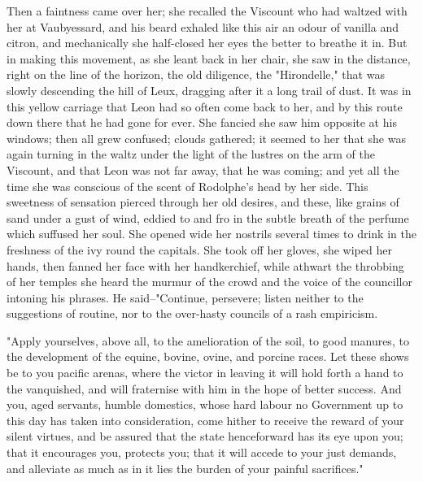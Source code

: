 \documentclass{tufte-book}
\begin{document}
Then a faintness came over her; she recalled the Viscount who had
waltzed with her at Vaubyessard, and his beard exhaled like this air an
odour of vanilla and citron, and mechanically she half-closed her eyes
the better to breathe it in. But in making this movement, as she leant
back in her chair, she saw in the distance, right on the line of the
horizon, the old diligence, the "Hirondelle," that was slowly descending
the hill of Leux, dragging after it a long trail of dust. It was in this
yellow carriage that Leon had so often come back to her, and by this
route down there that he had gone for ever. She fancied she saw him
opposite at his windows; then all grew confused; clouds gathered; it
seemed to her that she was again turning in the waltz under the light of
the lustres on the arm of the Viscount, and that Leon was not far away,
that he was coming; and yet all the time she was conscious of the scent
of Rodolphe's head by her side. This sweetness of sensation pierced
through her old desires, and these, like grains of sand under a gust
of wind, eddied to and fro in the subtle breath of the perfume which
suffused her soul. She opened wide her nostrils several times to drink
in the freshness of the ivy round the capitals. She took off her gloves,
she wiped her hands, then fanned her face with her handkerchief, while
athwart the throbbing of her temples she heard the murmur of the
crowd and the voice of the councillor intoning his phrases. He
said--"Continue, persevere; listen neither to the suggestions of
routine, nor to the over-hasty councils of a rash empiricism.

"Apply yourselves, above all, to the amelioration of the soil, to good
manures, to the development of the equine, bovine, ovine, and porcine
races. Let these shows be to you pacific arenas, where the victor in
leaving it will hold forth a hand to the vanquished, and will fraternise
with him in the hope of better success. And you, aged servants, humble
domestics, whose hard labour no Government up to this day has taken into
consideration, come hither to receive the reward of your silent virtues,
and be assured that the state henceforward has its eye upon you; that it
encourages you, protects you; that it will accede to your just
demands, and alleviate as much as in it lies the burden of your painful
sacrifices."
\end{document}
